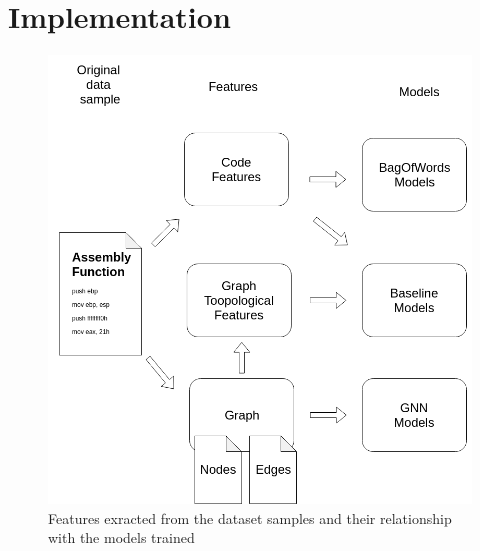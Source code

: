 \section{Implementation}



\begin{figure}[H]
    \centering
        \includegraphics[width=0.95\linewidth]{img/Features_and_models_diagram.png}
    \caption{Features exracted from the dataset samples and their relationship with the models trained}\label{fig:Features_diagram}
\end{figure}